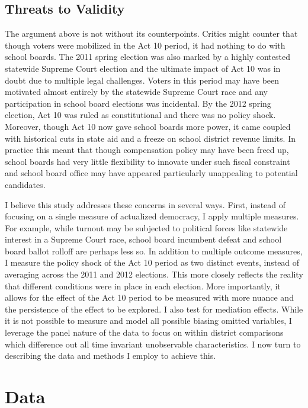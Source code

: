 \subsection{Threats to Validity}

The argument above is not without its counterpoints. Critics might counter that 
though voters were mobilized in the Act 10 period, it had nothing to do with 
school boards. The 2011 spring election was also marked by a highly contested 
statewide Supreme Court election and the ultimate impact of Act 10 was in doubt 
due to multiple legal challenges. Voters in this period may have been motivated 
almost entirely by the statewide Supreme Court race and any participation in 
school board elections was incidental. By the 2012 spring election, Act 10 
was ruled as constitutional and there was no policy shock. Moreover, though Act 10 
now gave school boards more power, it came coupled with historical cuts in 
state aid and a freeze on school district revenue limits. In practice this 
meant that though compensation policy may have been freed up, school boards had 
very little flexibility to innovate under such fiscal constraint and school board 
office may have appeared particularly unappealing to potential candidates. 

I believe this study addresses these concerns in several ways. First, instead of 
focusing on a single measure of actualized democracy, I apply multiple measures. 
For example, while turnout may be subjected to political forces like statewide 
interest in a Supreme Court race, school board incumbent defeat and school board 
ballot rolloff are perhaps less so. In addition to multiple outcome measures, I 
measure the policy shock of the Act 10 period as two distinct events, instead 
of averaging across the 2011 and 2012 elections. This more closely reflects the 
reality that different conditions were in place in 
each election. More importantly, it allows for the effect of the Act 10 period 
to be measured with more nuance and the persistence of the effect to be explored. 
I also test for mediation effects. While it is not possible to measure and model 
all possible biasing omitted variables, I leverage  the panel nature of the data to 
focus on within district comparisons which difference out all time invariant unobservable 
characteristics. I now turn to describing the data and methods I employ to achieve this. 

\section{Data}

